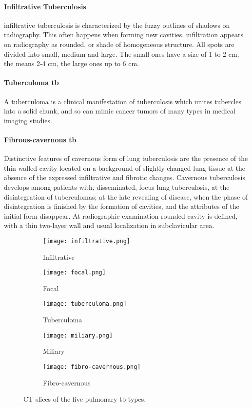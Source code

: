 \paragraph{Infiltrative Tuberculosis}
infiltrative tuberculosis is characterized by the fuzzy outlines of shadows on radiography. This often happens when forming new cavities. infiltration appears on radiography as rounded, or shade of homogeneous structure. All spots are divided into small, medium and large. The small ones have a size of 1 to 2 cm, the means 2-4 cm, the large ones up to 6 cm.\cite{TBINF:1}
\paragraph{Tuberculoma \ac{tb}}
A tuberculoma is a clinical manifestation of tuberculosis which unites tubercles into a solid chunk, and so can mimic cancer tumors of many types in medical imaging studies.\cite{TBTUM:1, TBTUM:2}
\paragraph{Fibrous-cavernous \ac{tb}}
Distinctive features of cavernous form of lung tuberculosis are the presence of the thin-walled cavity located on a background of slightly changed lung tissue at the absence of the expressed infiltrative and fibrotic changes. Cavernous tuberculosis develops among patients with, disseminated, focus lung tuberculosis, at the disintegration of tuberculomas; at the late revealing of disease, when the phase of disintegration is finished by the formation of cavities, and the attributes of the initial form disappear. At radiographic examination rounded cavity is defined, with a thin two-layer wall and usual localization in subclavicular area.\cite{TBFIB:1}
\begin{figure}[h!]
  \centering
  \begin{subfigure}[b]{0.3\linewidth}
    \texttt{[image: infiltrative.png]}
    \caption{Infiltrative}
  \end{subfigure}
  \begin{subfigure}[b]{0.3\linewidth}
    \texttt{[image: focal.png]}
    \caption{Focal}
  \end{subfigure}
  \begin{subfigure}[b]{0.3\linewidth}
    \texttt{[image: tuberculoma.png]}
    \caption{Tuberculoma}
  \end{subfigure}
  \begin{subfigure}[b]{0.3\linewidth}
    \texttt{[image: miliary.png]}
    \caption{Miliary}
  \end{subfigure}
  \begin{subfigure}[b]{0.3\linewidth}
    \texttt{[image: fibro-cavernous.png]}
    \caption{Fibro-cavernous}
  \end{subfigure}
  
  \caption{CT slices of the five pulmonary \ac{tb} types.\cite{ImageCLEF:1}}
  \label{fig:tb_types}
\end{figure}
\newpage
